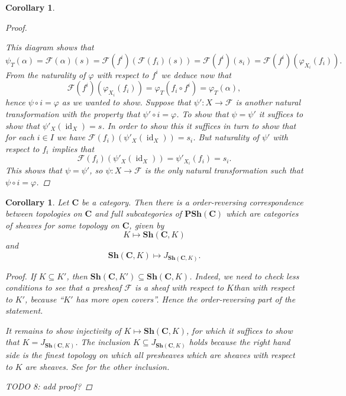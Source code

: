 \documentclass[12pt,reqno,a4paper]{amsart}
\theoremstyle{plain}
\newtheorem{cor}[thm]{Corollary}
\theoremstyle{definition}
\theoremstyle{remark}
\begin{document}
\begin{cor}
\begin{proof}
\begin{center}
    \end{center}
    This diagram shows that
    \[ \psi_{T}(\alpha) = \mathscr{F}(\alpha)(s) = \mathscr{F}(f^{i})(\mathscr{F}(f_{i})(s)) = \mathscr{F}(f^{i})(s_{i}) = \mathscr{F}(f^{i})(\varphi_{X_{i}}(f_{i})). \]
    From the naturality of $\varphi$ with respect to $f^{i}$ we deduce now that
    \[ \mathscr{F}(f^{i})(\varphi_{X_{i}}(f_{i})) = \varphi_{T}(f_{i} \circ f^{i}) = \varphi_{T}(\alpha), \]
    hence $\psi \circ i = \varphi$ as we wanted to show.
    Suppose that $\psi' \colon X \to \mathscr{F}$ is another natural transformation with the property that $\psi' \circ i = \varphi$.
    To show that $\psi = \psi'$ it suffices to show that $\psi'_{X}(\operatorname{id}_{X}) = s$.
    In order to show this it suffices in turn to show that for each $i \in I$ we have $\mathscr{F}(f_{i})(\psi'_{X}(\operatorname{id}_{X})) = s_{i}$.
    But naturality of $\psi'$ with respect to $f_{i}$ implies that
    \[ \mathscr{F}(f_{i})(\psi'_{X}(\operatorname{id}_{X})) = \psi'_{X_{i}}(f_{i}) = s_{i}. \]
    This shows that $\psi = \psi'$, so $\psi \colon X \to \mathscr{F}$ is the only natural transformation such that $\psi \circ i = \varphi$.
  \end{proof}
\end{cor}

\begin{cor}\label{cor:correspondence}
  Let $\mathbf{C}$ be a category.
  Then there is a order-reversing correspondence between topologies on $\mathbf{C}$ and full subcategories of $\mathbf{PSh}(\mathbf{C})$ which are categories of sheaves for some topology on $\mathbf{C}$, given by
  \[ K \mapsto \mathbf{Sh}(\mathbf{C},K) \]
  and
  \[ \mathbf{Sh}(\mathbf{C},K) \mapsto J_{\mathbf{Sh}(\mathbf{C},K)}. \]
  \begin{proof}
    If $K \subseteq K'$, then $\mathbf{Sh}(\mathbf{C},K') \subseteq \mathbf{Sh}(\mathbf{C},K)$.
    Indeed, we need to check less conditions to see that a presheaf $\mathscr{F}$ is a sheaf with respect to $K$than with respect to $K'$, because ``$K'$ has more open covers''.
    Hence the order-reversing part of the statement.

    It remains to show injectivity of $K \mapsto \mathbf{Sh}(\mathbf{C},K)$, for which it suffices to show that $K = J_{\mathbf{Sh}(\mathbf{C},K)}$.
    The inclusion $K \subseteq J_{\mathbf{Sh}(\mathbf{C},K)}$ holds because the right hand side is the finest topology on which all presheaves which are sheaves with respect to $K$ are sheaves.
    See \cite[\href{https://stacks.math.columbia.edu/tag/00ZP}{Tag 00ZP}]{stacks-project} for the other inclusion.

    {\color{red} TODO 8: add proof?}
  \end{proof}
\end{cor}
\end{document}
